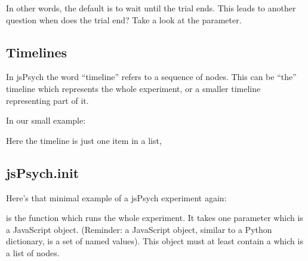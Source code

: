 \documentclass[letterpaper,10pt,english]{sphinxmanual}
\begin{document}
In other words, the default is to wait until the trial ends. This leads to
another question \textendash{} when does the trial end? Take a look at the
 parameter.


\subsection{Timelines}
\label{\detokenize{jspsych_au:timelines}}
In jsPsych the word “timeline” refers to a sequence of nodes. This can be “the”
timeline which represents the whole experiment, or a smaller timeline
representing part of it.

In our small example:

\begin{sphinxVerbatim}[commandchars=\\\{\}]
     \PYG{p}{[}\PYG{p}{]}
\end{sphinxVerbatim}

Here the timeline is just one item in a list,


\subsection{jsPsych.init}
\label{\detokenize{jspsych_au:jspsych-init}}
Here’s that minimal example of a jsPsych experiment again:

\begin{sphinxVerbatim}[commandchars=\\\{\}]
   
     
     

     \PYG{p}{[}\PYG{p}{]}
\end{sphinxVerbatim}

 is the function which runs the whole experiment. It takes
one parameter which is a JavaScript object. (Reminder: a JavaScript object,
similar to a Python dictionary, is a set of named values). This object must
at least contain a  which is a list of nodes.
\end{document}
